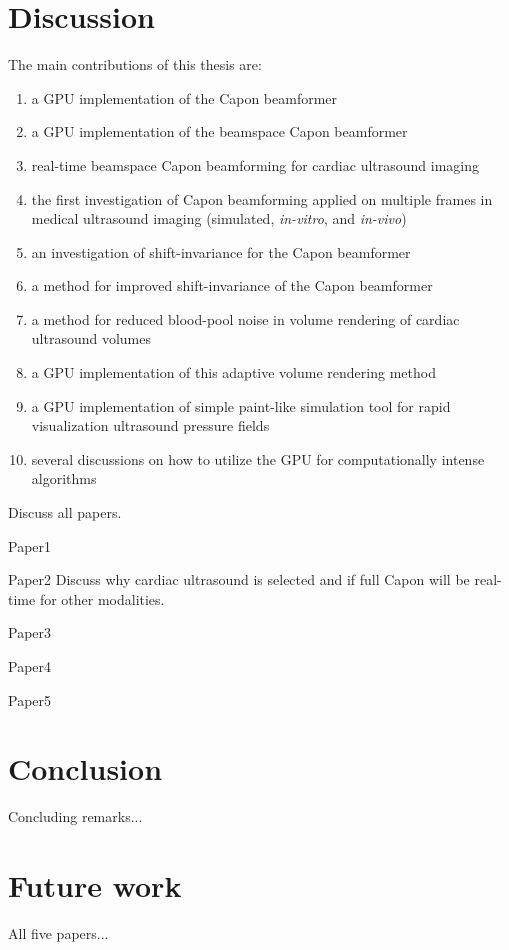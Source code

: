 \section{Discussion}
The main contributions of this thesis are:
\begin{enumerate}
\item a GPU implementation of the Capon beamformer
\item a GPU implementation of the beamspace Capon beamformer
\item real-time beamspace Capon beamforming for cardiac ultrasound imaging
\item the first investigation of Capon beamforming applied on multiple frames in medical ultrasound imaging (simulated, \textit{in-vitro}, and \textit{in-vivo})
\item an investigation of shift-invariance for the Capon beamformer
\item a method for improved shift-invariance of the Capon beamformer
\item a method for reduced blood-pool noise in volume rendering of cardiac ultrasound volumes
\item a GPU implementation of this adaptive volume rendering method
\item a GPU implementation of simple paint-like simulation tool for rapid visualization ultrasound pressure fields
\item several discussions on how to utilize the GPU for computationally intense algorithms  
\end{enumerate}

Discuss all papers.

Paper1

Paper2
Discuss why cardiac ultrasound is selected and if full Capon will be real-time for other modalities.

Paper3

Paper4

Paper5

\section{Conclusion}

Concluding remarks...

\section{Future work}

All five papers...

\endinput